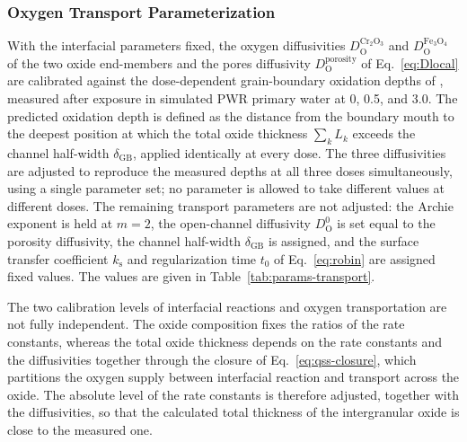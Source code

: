 \documentclass[3p,times,nonatbib]{elsarticle} %
\newcommand{\GB}{\mathrm{GB}}
\newcommand{\Ox}{\mathrm{O}}           %
\begin{document}
\subsubsection{Oxygen Transport Parameterization}
\label{sec:methodTransportCalibration}
With the interfacial parameters fixed, the oxygen diffusivities
\(D_{\Ox}^{\mathrm{Cr_2O_3}}\) and \(D_{\Ox}^{\mathrm{Fe_3O_4}}\) of the two
oxide end-members and the pores diffusivity \(D_{\Ox}^{\mathrm{porosity}}\) of
Eq.~\eqref{eq:Dlocal} are calibrated against the dose-dependent
grain-boundary oxidation depths of \textcite{deng2017effect}, measured after
exposure in simulated PWR primary water at 0, 0.5, and \SI{3.0}{\dpa}. The
predicted oxidation depth is defined as the distance from the boundary mouth
to the deepest position at which the total oxide thickness \(\sum_k L_k\) exceeds the
channel half-width \(\delta_{\GB}\), applied identically at every dose. The
three diffusivities are adjusted to reproduce the measured depths at all
three doses simultaneously, using a single parameter set; no parameter is
allowed to take different values at different doses. The remaining transport
parameters are not adjusted: the Archie exponent is held at \(m=2\), the
open-channel diffusivity \(D_{\Ox}^{0}\) is set equal to the porosity
diffusivity, the channel half-width \(\delta_{\GB}\) is assigned, and the
surface transfer coefficient \(k_{\mathrm{s}}\) and regularization time
\(t_0\) of Eq.~\eqref{eq:robin} are assigned fixed values. The values are given in
Table~\ref{tab:params-transport}.

The two calibration levels of interfacial reactions and oxygen transportation are not fully independent. The oxide composition
fixes the ratios of the rate constants, whereas the total oxide thickness
depends on the rate constants and the diffusivities together through the
closure of Eq.~\eqref{eq:qss-closure}, which partitions the oxygen supply
between interfacial reaction and transport across the oxide. The absolute
level of the rate constants is therefore adjusted, together with the
diffusivities, so that the calculated total thickness of the intergranular
oxide is close to the measured one.
\end{document}
